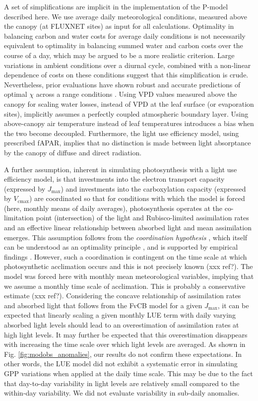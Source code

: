 \documentclass{myreport}
\newcommand{\vcmax}{$V_{\text{cmax}}$}
\newcommand{\jmax}{$J_{\text{max}}$}
\begin{document}
A set of simplifications are implicit in the implementation of the P-model described here. We use average daily meteorological conditions, measured above the canopy (at FLUXNET sites) as input for all calculations. Optimality in balancing carbon and water costs for average daily conditions is not necessarily equivalent to optimality in balancing summed water and carbon costs over the course of a day, which may be argued to be a more realistic criterion. Large variations in ambient conditions over a diurnal cycle, combined with a non-linear dependence of costs on these conditions suggest that this simplification is crude. Nevertheless, prior evaluations have shown robust and accurate predictions of optimal $\chi$ across a range conditions \citep{wang17natpl}. Using VPD values measured above the canopy for scaling water losses, instead of VPD at the leaf surface (or evaporation sites), implicitly assumes a perfectly coupled atmospheric boundary layer. Using above-canopy air temperature instead of leaf temperatures introduces a bias when the two become decoupled. Furthermore, the light use efficiency model, using prescribed fAPAR, implies that no distinction is made between light absorptance by the canopy of diffuse and direct radiation. 

A further assumption, inherent in simulating photosynthesis with a light use efficiency model, is that investments into the electron transport capacity (expressed by \jmax ) and investments into the carboxylation capacity (expressed by \vcmax ) are coordinated so that for conditions with which the model is forced (here, monthly means of daily averages), photosynthesis operates at the co-limitation point (intersection) of the light and Rubisco-limited assimilation rates and an effective linear relationship between absorbed light and mean assimilation emerges. This assumption follows from the \textit{coordination hypothesis} \citep{chen93, haxeltine96}, which itself can be understood as an optimality principle \citep{chen93}, and is supported by empirical findings \citep{maire12po}. However, such a coordination is contingent on the time scale at which photosynthetic acclimation occurs and this is not precisely known (xxx ref?). The model was forced here with monthly mean meteorological variables, implying that we assume a monthly time scale of acclimation. This is probably a conservative estimate (xxx ref?). Considering the concave relationship of assimilation rates and absorbed light that follows from the FvCB model for a given \jmax , it can be expected that linearly scaling a given monthly LUE term with daily varying absorbed light levels should lead to an overestimation of assimilation rates at high light levels. It may further be expected that this overestimation disappears with increasing the time scale over which light levels are averaged. As shown in Fig. \ref{fig:modobs_anomalies}, our results do not confirm these expectations. In other words, the LUE model did not exhibit a systematic error in simulating GPP variations when applied at the daily time scale. This may be due to the fact that day-to-day variability in light levels are relatively small compared to the within-day variability. We did not evaluate variability in sub-daily anomalies.
\end{document}
